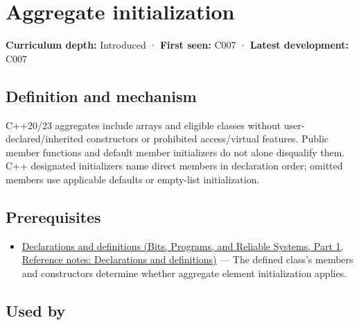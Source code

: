 \hypertarget{appendix-b7174c179542}{}\label{referencestart:appendix-b7174c179542}
\section{Aggregate initialization}\label{appendix-b7174c179542-aggregate-initialization}

\hypertarget{appendix-b7174c179542-aggregate-initialization}{}

\textbf{Curriculum depth:} Introduced · \textbf{First seen:} C007 · \textbf{Latest development:} C007

\begin{allmightroledefinition}

\subsection{Definition and mechanism}\label{appendix-b7174c179542-definition-and-mechanism}

\hypertarget{appendix-b7174c179542-definition-and-mechanism}{}

C++20/23 aggregates include arrays and eligible classes without user-declared/inherited constructors or prohibited access/virtual features. Public member functions and default member initializers do not alone disqualify them. C++ designated initializers name direct members in declaration order; omitted members use applicable defaults or empty-list initialization.

\end{allmightroledefinition}

\subsection{Prerequisites}\label{appendix-b7174c179542-prerequisites}

\hypertarget{appendix-b7174c179542-prerequisites}{}

\begin{itemize}
\tightlist
\item
  \href{../01-Bits-Programs-and-Reliable-Systems-P01/main.pdf\#nameddest=appendix-2e4d494c2d94}{Declarations and definitions (Bits, Programs, and Reliable Systems, Part 1, Reference notes: Declarations and definitions)} --- The defined class's members and constructors determine whether aggregate element initialization applies.
\end{itemize}

\subsection{Used by}\label{appendix-b7174c179542-used-by}

